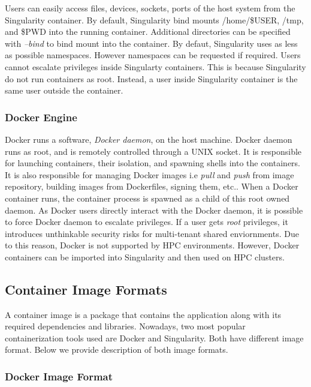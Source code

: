 \documentclass[a4paper,num-refs]{oup-contemporary}
\begin{document}
Users can easily access files, devices, sockets, ports of the host system from
the Singularity container. By default, Singularity bind mounts /home/\$USER, /tmp, and \$PWD
into the running container. Additional directories can be specified with \textit{--bind}
to bind mount into the container. By defaut, Singularity uses as less as possible namespaces.
However namespaces can be requested if required. Users cannot escalate privileges inside
Singularty containers. This is because Singularity do not run containers as root.
Instead, a user inside Singularity container is the same user outside the container.


\subsubsection{Docker Engine}

Docker runs a software, \textit{Docker daemon}, on the host machine.
Docker daemon runs as root, and is remotely controlled through a
UNIX socket. It is responsible for launching containers, their
isolation, and spawning shells into the containers. It is also
responsible for managing Docker images i.e \textit{pull} and \textit{push}
from image repository, building images from Dockerfiles, signing them, etc..
When a Docker container runs, the container process is spawned as a
child of this root owned daemon. As Docker users directly interact with the
Docker daemon, it is possible to force Docker daemon to escalate privileges.
If a user gets \textit{root} privileges, it introduces unthinkable security risks
for multi-tenant shared enviornments. Due to this reason, Docker is not
supported by HPC environments. However, Docker containers can be imported into
Singularity and then used on HPC clusters.

\subsection{Container Image Formats}

A container image is a package that contains the application along with its
required dependencies and libraries.
Nowadays, two most popular containerization tools used are Docker and Singularity.
Both have different image format. Below we provide description of both image
formats.

\subsubsection{Docker Image Format}
\end{document}
